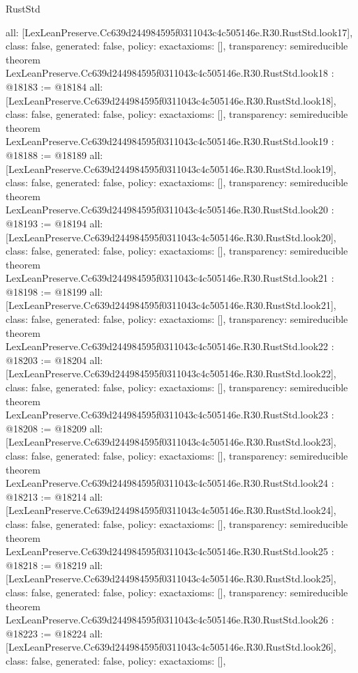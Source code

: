 \begin{lexlean}{RustStd}
\begin{coremodule}
{  all: [LexLeanPreserve.Cc639d244984595f0311043c4c505146e.R30.RustStd.look17],
  class: false,
  generated: false,
  policy: exact{axioms: []},
  transparency: semireducible
}
theorem LexLeanPreserve.Cc639d244984595f0311043c4c505146e.R30.RustStd.look18 : @18183 := @18184 {
  all: [LexLeanPreserve.Cc639d244984595f0311043c4c505146e.R30.RustStd.look18],
  class: false,
  generated: false,
  policy: exact{axioms: []},
  transparency: semireducible
}
theorem LexLeanPreserve.Cc639d244984595f0311043c4c505146e.R30.RustStd.look19 : @18188 := @18189 {
  all: [LexLeanPreserve.Cc639d244984595f0311043c4c505146e.R30.RustStd.look19],
  class: false,
  generated: false,
  policy: exact{axioms: []},
  transparency: semireducible
}
theorem LexLeanPreserve.Cc639d244984595f0311043c4c505146e.R30.RustStd.look20 : @18193 := @18194 {
  all: [LexLeanPreserve.Cc639d244984595f0311043c4c505146e.R30.RustStd.look20],
  class: false,
  generated: false,
  policy: exact{axioms: []},
  transparency: semireducible
}
theorem LexLeanPreserve.Cc639d244984595f0311043c4c505146e.R30.RustStd.look21 : @18198 := @18199 {
  all: [LexLeanPreserve.Cc639d244984595f0311043c4c505146e.R30.RustStd.look21],
  class: false,
  generated: false,
  policy: exact{axioms: []},
  transparency: semireducible
}
theorem LexLeanPreserve.Cc639d244984595f0311043c4c505146e.R30.RustStd.look22 : @18203 := @18204 {
  all: [LexLeanPreserve.Cc639d244984595f0311043c4c505146e.R30.RustStd.look22],
  class: false,
  generated: false,
  policy: exact{axioms: []},
  transparency: semireducible
}
theorem LexLeanPreserve.Cc639d244984595f0311043c4c505146e.R30.RustStd.look23 : @18208 := @18209 {
  all: [LexLeanPreserve.Cc639d244984595f0311043c4c505146e.R30.RustStd.look23],
  class: false,
  generated: false,
  policy: exact{axioms: []},
  transparency: semireducible
}
theorem LexLeanPreserve.Cc639d244984595f0311043c4c505146e.R30.RustStd.look24 : @18213 := @18214 {
  all: [LexLeanPreserve.Cc639d244984595f0311043c4c505146e.R30.RustStd.look24],
  class: false,
  generated: false,
  policy: exact{axioms: []},
  transparency: semireducible
}
theorem LexLeanPreserve.Cc639d244984595f0311043c4c505146e.R30.RustStd.look25 : @18218 := @18219 {
  all: [LexLeanPreserve.Cc639d244984595f0311043c4c505146e.R30.RustStd.look25],
  class: false,
  generated: false,
  policy: exact{axioms: []},
  transparency: semireducible
}
theorem LexLeanPreserve.Cc639d244984595f0311043c4c505146e.R30.RustStd.look26 : @18223 := @18224 {
  all: [LexLeanPreserve.Cc639d244984595f0311043c4c505146e.R30.RustStd.look26],
  class: false,
  generated: false,
  policy: exact{axioms: []},
}
\end{coremodule}
\end{lexlean}
